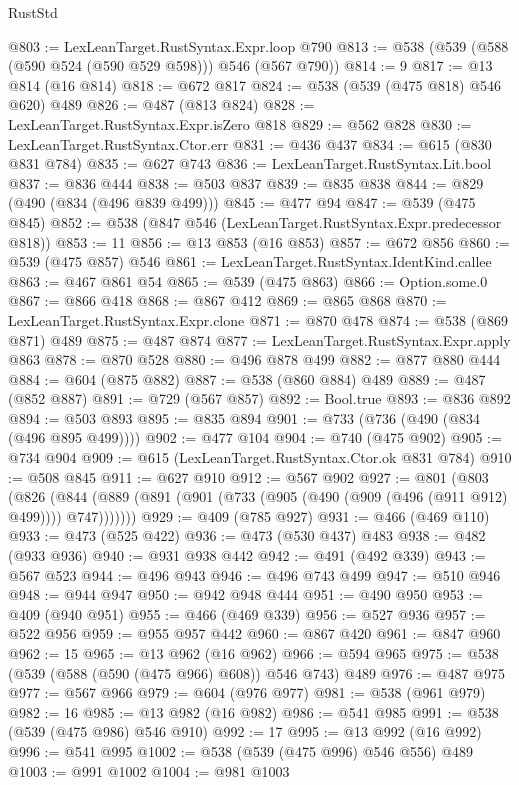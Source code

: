 \begin{lexlean}{RustStd}
\begin{coremodule}
{\begin{coremodule}
{{{{{{{{{{{@803 := LexLeanTarget.RustSyntax.Expr.loop @790
@813 := @538 (@539 (@588 (@590 @524 (@590 @529 @598))) @546 (@567 @790))
@814 := 9
@817 := @13 @814 (@16 @814)
@818 := @672 @817
@824 := @538 (@539 (@475 @818) @546 @620) @489
@826 := @487 (@813 @824)
@828 := LexLeanTarget.RustSyntax.Expr.isZero @818
@829 := @562 @828
@830 := LexLeanTarget.RustSyntax.Ctor.err
@831 := @436 @437
@834 := @615 (@830 @831 @784)
@835 := @627 @743
@836 := LexLeanTarget.RustSyntax.Lit.bool
@837 := @836 @444
@838 := @503 @837
@839 := @835 @838
@844 := @829 (@490 (@834 (@496 @839 @499)))
@845 := @477 @94
@847 := @539 (@475 @845)
@852 := @538 (@847 @546 (LexLeanTarget.RustSyntax.Expr.predecessor @818))
@853 := 11
@856 := @13 @853 (@16 @853)
@857 := @672 @856
@860 := @539 (@475 @857) @546
@861 := LexLeanTarget.RustSyntax.IdentKind.callee
@863 := @467 @861 @54
@865 := @539 (@475 @863)
@866 := Option.some.{0}
@867 := @866 @418
@868 := @867 @412
@869 := @865 @868
@870 := LexLeanTarget.RustSyntax.Expr.clone
@871 := @870 @478
@874 := @538 (@869 @871) @489
@875 := @487 @874
@877 := LexLeanTarget.RustSyntax.Expr.apply @863
@878 := @870 @528
@880 := @496 @878 @499
@882 := @877 @880 @444
@884 := @604 (@875 @882)
@887 := @538 (@860 @884) @489
@889 := @487 (@852 @887)
@891 := @729 (@567 @857)
@892 := Bool.true
@893 := @836 @892
@894 := @503 @893
@895 := @835 @894
@901 := @733 (@736 (@490 (@834 (@496 @895 @499))))
@902 := @477 @104
@904 := @740 (@475 @902)
@905 := @734 @904
@909 := @615 (LexLeanTarget.RustSyntax.Ctor.ok @831 @784)
@910 := @508 @845
@911 := @627 @910
@912 := @567 @902
@927 := @801
    (@803
      (@826 (@844 (@889 (@891 (@901 (@733 (@905 (@490 (@909 (@496 (@911 @912) @499)))) @747)))))))
@929 := @409 (@785 @927)
@931 := @466 (@469 @110)
@933 := @473 (@525 @422)
@936 := @473 (@530 @437) @483
@938 := @482 (@933 @936)
@940 := @931 @938 @442
@942 := @491 (@492 @339)
@943 := @567 @523
@944 := @496 @943
@946 := @496 @743 @499
@947 := @510 @946
@948 := @944 @947
@950 := @942 @948 @444
@951 := @490 @950
@953 := @409 (@940 @951)
@955 := @466 (@469 @339)
@956 := @527 @936
@957 := @522 @956
@959 := @955 @957 @442
@960 := @867 @420
@961 := @847 @960
@962 := 15
@965 := @13 @962 (@16 @962)
@966 := @594 @965
@975 := @538 (@539 (@588 (@590 (@475 @966) @608)) @546 @743) @489
@976 := @487 @975
@977 := @567 @966
@979 := @604 (@976 @977)
@981 := @538 (@961 @979)
@982 := 16
@985 := @13 @982 (@16 @982)
@986 := @541 @985
@991 := @538 (@539 (@475 @986) @546 @910)
@992 := 17
@995 := @13 @992 (@16 @992)
@996 := @541 @995
@1002 := @538 (@539 (@475 @996) @546 @556) @489
@1003 := @991 @1002
@1004 := @981 @1003
}}}}}}}}}}}
\end{coremodule}}
\end{coremodule}
\end{lexlean}
